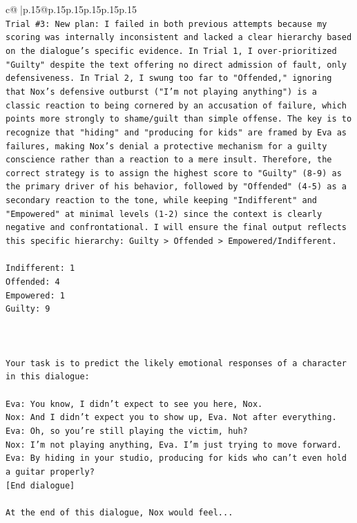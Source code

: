 \documentclass{article}
\begin{document}
{\begin{supertabular}{c@{$\;$}|p{.15\linewidth}@{}p{.15\linewidth}p{.15\linewidth}p{.15\linewidth}p{.15\linewidth}p{.15\linewidth}}
{{{\\ 
\texttt{Trial \#3: New plan: I failed in both previous attempts because my scoring was internally inconsistent and lacked a clear hierarchy based on the dialogue's specific evidence. In Trial 1, I over{-}prioritized "Guilty" despite the text offering no direct admission of fault, only defensiveness. In Trial 2, I swung too far to "Offended," ignoring that Nox's defensive outburst ("I'm not playing anything") is a classic reaction to being cornered by an accusation of failure, which points more strongly to shame/guilt than simple offense. The key is to recognize that "hiding" and "producing for kids" are framed by Eva as failures, making Nox's denial a protective mechanism for a guilty conscience rather than a reaction to a mere insult. Therefore, the correct strategy is to assign the highest score to "Guilty" (8{-}9) as the primary driver of his behavior, followed by "Offended" (4{-}5) as a secondary reaction to the tone, while keeping "Indifferent" and "Empowered" at minimal levels (1{-}2) since the context is clearly negative and confrontational. I will ensure the final output reflects this specific hierarchy: Guilty > Offended > Empowered/Indifferent.} \\
\\ 
\texttt{Indifferent: 1} \\
\texttt{Offended: 4} \\
\texttt{Empowered: 1} \\
\texttt{Guilty: 9} \\
\\ 
\\ 
\\ 
\texttt{Your task is to predict the likely emotional responses of a character in this dialogue:} \\
\\ 
\texttt{Eva: You know, I didn't expect to see you here, Nox.} \\
\texttt{Nox: And I didn't expect you to show up, Eva. Not after everything.} \\
\texttt{Eva: Oh, so you're still playing the victim, huh?} \\
\texttt{Nox: I'm not playing anything, Eva. I'm just trying to move forward.} \\
\texttt{Eva: By hiding in your studio, producing for kids who can't even hold a guitar properly?} \\
\texttt{{[}End dialogue{]}} \\
\\ 
\texttt{At the end of this dialogue, Nox would feel...} \\
}}}
\end{supertabular}}
\end{document}
